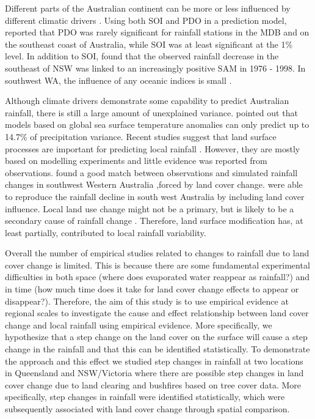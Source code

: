 \documentclass[draft,linenumbers]{agujournal}
\begin{document}
Different parts of the Australian continent can be more or less influenced by different climatic drivers \citep{Mla2008}. Using both SOI and PDO in a prediction model, \citet{Kamruzzaman2011} reported that PDO was rarely significant for rainfall stations in the MDB and on the southeast coast of Australia, while SOI was at least significant at the 1\% level. In addition to SOI, \citet{Speer2011} found that the observed rainfall decrease in the southeast of NSW was linked to an increasingly positive SAM in 1976 - 1998. In southwest WA, the influence of any oceanic indices is small \citep{Smith2012}.

Although climate drivers demonstrate some capability to predict Australian rainfall, there is still a large amount of unexplained variance. \citet{Westra2010} pointed out that models based on global sea surface temperature anomalies can only predict up to 14.7\% of precipitation variance. Recent studies suggest that land surface processes are important for predicting local rainfall \citep[e.g.][]{Ma2011,Zeng2012, pitman_scale_2016, saha_investigating_2016}. However, they are mostly based on modelling experiments and little evidence was reported from observations. \citet{Pitman2004} found a good match between observations and simulated rainfall changes in southwest Western Australia ,forced by land cover change. \citet{Timbal2006} were able to reproduce the rainfall decline in south west Australia by including land cover influence. Local land use change might not be a primary, but is likely to be a secondary cause of rainfall change \citep{Nicholls2006}. Therefore, land surface modification has, at least partially, contributed to local rainfall variability.

Overall the number of empirical studies related to changes to rainfall due to land cover change is limited. This is because there are some fundamental experimental difficulties in both space (where does evaporated water reappear as rainfall?) and in time (how much time does it take for land cover change effects to appear or disappear?). Therefore, the aim of this study is to use empirical evidence at regional scales to investigate the cause and effect relationship between land cover change and local rainfall using empirical evidence. More specifically, we hypothesize that a step change on the land cover on the surface will cause a step change in the rainfall and that this can be identified statistically. To demonstrate the approach and this effect we studied step changes in rainfall at two locations in Queensland and NSW/Victoria where there are possible step changes in land cover change due to land clearing and bushfires based on tree cover data. More specifically,  step changes in rainfall were identified statistically, which were subsequently associated with land cover change through spatial comparison.
\end{document}
